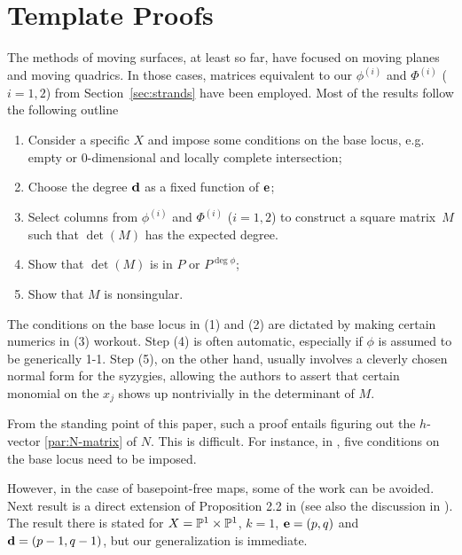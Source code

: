 \documentclass[fleqn,reqno]{amsart}
\begin{document}


\section{Template Proofs}

\begin{paragraf}
\label{par:template-proof}
The methods of moving surfaces, at least so far, have focused on
moving planes and moving quadrics.
In those cases, matrices equivalent to our $\phi^{(i)}$ and $\Phi^{(i)}$ ($i=1,2$)
from Section~\ref{sec:strands} have been employed.
Most of the results follow the following outline
\begin{enumerate}
\item
Consider a specific $X$ and impose some conditions on the base locus,
e.g. empty or 0-dimensional and locally complete intersection;
\item
Choose the degree $\mathbf d$ as a fixed function of $\mathbf e$;
\item
Select columns from $\phi^{(i)}$ and $\Phi^{(i)}$ ($i=1,2$) to construct a square matrix~$M$
such that $\det(M)$ has the expected degree.
\item
Show that $\det(M)$ is in $P$ or $P^{\deg\phi}$;
\item
Show that $M$ is nonsingular.
\end{enumerate}

The conditions on the base locus in (1) and (2) are dictated by
making certain numerics in (3) workout.
Step (4) is often automatic, especially if $\phi$ is assumed to be generically 1-1.
Step (5), on the other hand, usually involves a cleverly chosen normal form for the syzygies,
allowing the authors to assert that certain monomial on the $x_j$ shows up nontrivially
in the determinant of $M$.
\end{paragraf}

\begin{paragraf}
From the standing point of this paper, such a proof entails
figuring out the $h$-vector \eqref{par:N-matrix} of $N$.
This is difficult.
For instance, in \citet{BCD-03},
five conditions on the base locus need to be imposed.
\end{paragraf}

\begin{paragraf*}
However, in the case of basepoint-free maps, some of the work can be avoided.
Next result is a direct extension of Proposition 2.2 in \citet{CGZ-00}
(see also the discussion in \citet{Cox-01}).
The result there is stated for $X=\mathbb{P}^1\times\mathbb{P}^1$, $k=1$, $\mathbf e=(p,q)$ and $\mathbf d=(p-1,q-1)$,
but our generalization is immediate.
\end{paragraf*}
\end{document}
